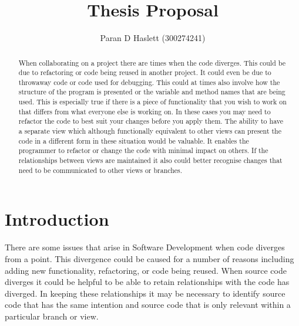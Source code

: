 \documentclass[12pt]{CRPITStyle}
\begin{document}
\title{Thesis Proposal}
\author{Paran D Haslett (300274241)}
\maketitle

\begin{abstract}
When collaborating on a project there are times when the code diverges. This could be due to refactoring or code being reused in another project. It could even be due to throwaway code or code used for debugging. This could at times also involve how the structure of the program is presented or the variable and method names that are being used. This is especially true if there is a piece of functionality that you wish to work on that differs from what everyone else is working on. In these cases you may need to refactor the code to best suit your changes before you apply them. The ability to have a separate view which although functionally equivalent to other views can present the code in a different form in these situation would be valuable. It enables the programmer to refactor or change the code with minimal impact on others. If the relationships between views are maintained it also could better recognise changes that need to be communicated to other views or branches.
\end{abstract}
\vspace{.1in}


\section{Introduction}
There are some issues that arise in Software Development when code diverges from a point. This divergence could be caused for a number of reasons including adding new functionality, refactoring, or code being reused. When source code diverges it could be helpful to be able to retain relationships with the code has diverged. In keeping these relationships it may be necessary to identify source code that has the same intention and source code that is only relevant within a particular branch or view.
\end{document}
